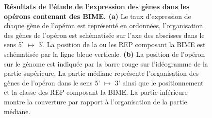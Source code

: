 \documentclass[12pt,a4paper]{report}
\begin{document}
\begin{onehalfspace}
\begin{figure}[ht]
\centering
{}
\caption{\textbf{Résultats de l'étude de l'expression des gènes dans les opérons contenant des BIME. (a)} Le taux d'expression de chaque gène de l'opéron est représenté en ordonnées, l'organisation des gènes de l'opéron est schématisée sur l'axe des abscisses dans le sens 5' $\mapsto$ 3'. La position de la ou les REP composant la BIME est schématisée par la ligne bleue verticale. \textbf{(b)} La position de l'opéron sur le génome est indiquée par la barre rouge sur l'idéogramme de la partie supérieure. La partie médiane représente l'organisation des gènes de l'opéron dans le sens 5' $\mapsto$ 3' ainsi que le positionnement et la classe des REP composant la BIME. La partie inférieure montre la couverture par rapport à l'organisation de la partie médiane.}
\label{fig:expression} 
\end{figure}


\end{onehalfspace}
\end{document}

